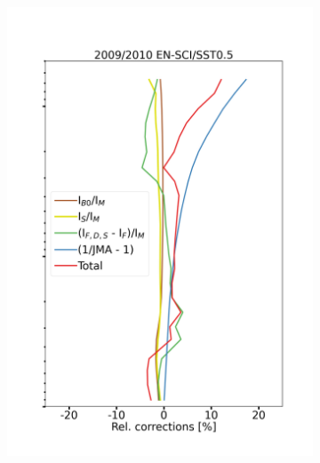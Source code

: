 \documentclass{article}
\begin{document}
\begin{figure}
\begin{subfigure}[t]{0.33\textwidth}
            \includegraphics[width=\linewidth]{png/relative_corrections_unc__sm_hv_0910_TRRM_EN0505}
        \end{subfigure}
    \end{figure}

    
\end{document}

